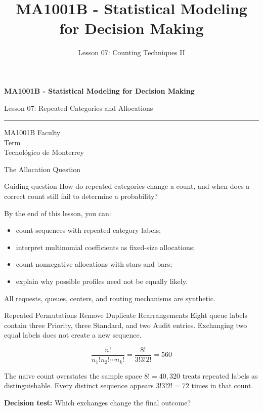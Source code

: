 \documentclass[aspectratio=169,10pt,english]{beamer}
\title{MA1001B - Statistical Modeling for Decision Making}
\subtitle{Lesson 07: Counting Techniques II}
\author{}
\institute{Tecnol\'ogico de Monterrey}
\date{}
\begin{document}
\begin{frame}[plain]
  \vspace{1.2cm}
  {\Large\bfseries MA1001B - Statistical Modeling for Decision Making\par}
  \vspace{0.7cm}
  {\large Lesson 07: Repeated Categories and Allocations\par}
  \vspace{0.7cm}
  {\color{TecRojo}\rule{\textwidth}{1.2pt}}
  \vspace{0.8cm}

  MA1001B Faculty\\[0.3cm]
  Term\\[0.3cm]
  Tecnol\'ogico de Monterrey
\end{frame}

\begin{frame}{The Allocation Question}
  \begin{alertblock}{Guiding question}
    How do repeated categories change a count, and when does a correct count
    still fail to determine a probability?
  \end{alertblock}

  \vspace{0.4em}
  By the end of this lesson, you can:
  \begin{itemize}
    \item count sequences with repeated category labels;
    \item interpret multinomial coefficients as fixed-size allocations;
    \item count nonnegative allocations with stars and bars;
    \item explain why possible profiles need not be equally likely.
  \end{itemize}

  \vfill
  \scriptsize All requests, queues, centers, and routing mechanisms are synthetic.
\end{frame}

\begin{frame}{Repeated Permutations Remove Duplicate Rearrangements}
  \small
  Eight queue labels contain three Priority, three Standard, and two Audit
  entries. Exchanging two equal labels does not create a new sequence.

  \[
    \frac{n!}{n_1!n_2!\cdots n_k!}
    =\frac{8!}{3!3!2!}=560
  \]

  \begin{alertblock}{The naive count overstates the sample space}
    \(8!=40{,}320\) treats repeated labels as distinguishable. Every distinct
    sequence appears \(3!3!2!=72\) times in that count.
  \end{alertblock}

  \textbf{Decision test:} Which exchanges change the final outcome?
\end{frame}
\end{document}
